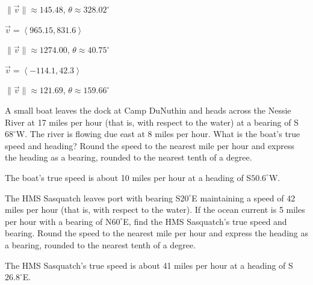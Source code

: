 \documentclass{ximera}
\begin{document}
\begin{question}
\begin{problem}
\begin{solution}
$\|\overrightarrow{v}\| \approx 145.48$, $\theta \approx 328.02^{\circ}$
\end{solution}
\end{problem}

\begin{problem}
$\overrightarrow{v} = \left<965.15, 831.6\right>$

\begin{solution}
$\|\overrightarrow{v}\| \approx 1274.00$, $\theta \approx 40.75^{\circ}$
\end{solution}
\end{problem}

\begin{problem} \label{findmaganglelast}
$\overrightarrow{v} = \left<-114.1, 42.3\right>$

\begin{solution}
$\|\overrightarrow{v}\| \approx 121.69$, $\theta \approx 159.66^{\circ}$
\end{solution}
\end{problem}

\end{question}

\begin{problem}
A small boat leaves the dock at Camp DuNuthin and heads across the Nessie River at 17 miles per hour (that is, with respect to the water) at a bearing of  S$68^{\circ}$W.   The river is flowing due east at 8 miles per hour.  What is the boat's true speed and heading?  Round the speed to the nearest mile per hour and express the heading as a bearing, rounded to the nearest tenth of a degree.

\begin{solution}
The boat's true speed is about 10 miles per hour at a heading of S$50.6^{\circ}$W.
\end{solution}
\end{problem}

\begin{problem} \label{HMSSasquatchVectorBearing} 
The HMS Sasquatch leaves port with bearing S$20^{\circ}$E maintaining a speed of 42 miles per hour (that is, with respect to the water).  If the ocean current is 5 miles per hour with a bearing of N$60^{\circ}$E, find the HMS Sasquatch's true speed and bearing.  Round the speed to the nearest mile per hour and express the heading as a bearing, rounded to the nearest tenth of a degree. 

\begin{solution}
The HMS Sasquatch's true speed is about 41 miles per hour at a heading of S$26.8^{\circ}$E.
\end{solution}
\end{problem}
\end{document}
